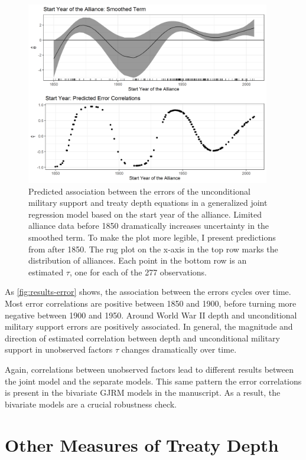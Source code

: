 \documentclass[12pt]{article}
\begin{document}
\begin{figure}[hbtp]
\centering
\includegraphics[width=0.95\textwidth]{results-error.png}
\caption{Predicted association between the errors of the unconditional military support and treaty depth equations in a generalized joint regression model based on the start year of the alliance. Limited alliance data before 1850 dramatically increases uncertainty in the smoothed term. To make the plot more legible, I present predictions from after 1850. The rug plot on the x-axis in the top row marks the distribution of alliances. Each point in the bottom row is an estimated $\tau$, one for each of the 277 observations.}
\label{fig:results-error}
\end{figure}


As \autoref{fig:results-error} shows, the association between the errors cycles over time. 
Most error correlations are positive between 1850 and 1900, before turning more negative between 1900 and 1950. 
Around World War II depth and unconditional military support errors are positively associated. 
In general, the magnitude and direction of estimated correlation between depth and unconditional military support in unobserved factors $\tau$ changes dramatically over time.  


Again, correlations between unobserved factors lead to different results between the joint model and the separate models. 
This same pattern the error correlations is present in the bivariate GJRM models in the manuscript.
As a result, the bivariate models are a crucial robustness check. 



\section{Other Measures of Treaty Depth}
\end{document}
